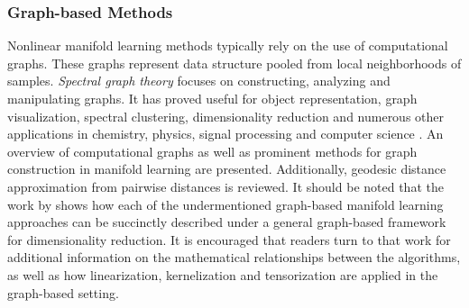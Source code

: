 \subsubsection{Graph-based Methods}
Nonlinear manifold learning methods typically rely on the use of computational graphs.  These graphs represent data structure pooled from local neighborhoods of samples.  \textit{Spectral graph theory} focuses on constructing, analyzing and manipulating graphs.  It has proved useful for object representation, graph visualization, spectral clustering, dimensionality reduction and numerous other applications in chemistry, physics, signal processing and computer science \citep{Shuman2013SignalProcessingGraphs, Bengoetxea2002ThesisGraphMatching}.   An overview of computational graphs as well as prominent methods for graph construction in manifold learning are presented. Additionally, geodesic distance approximation from pairwise distances is reviewed.  It should be noted that the work by \cite{Yan2007GeneralGraphEmbeddingFramework} shows how each of the undermentioned graph-based manifold learning approaches can be succinctly described under a general graph-based framework for dimensionality reduction.  It is encouraged that readers turn to that work for additional information on the mathematical relationships between the algorithms, as well as how linearization, kernelization and tensorization are applied in the graph-based setting.

